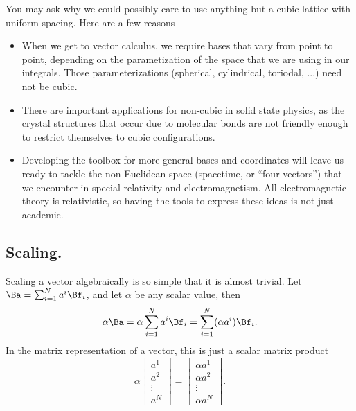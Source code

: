 You may ask why we could possibly care to use anything but a cubic lattice with uniform spacing.
Here are a few reasons
\begin{itemize}
\item When we get to vector calculus, we require bases that vary from point to point, depending on the parametization of the space that we are using in our integrals.
Those parameterizations (spherical, cylindrical, toriodal, ...) need not be cubic.
\item There are important applications for non-cubic in solid state physics, as the crystal structures that occur due to molecular bonds are not friendly enough to restrict themselves to cubic configurations.
\item Developing the toolbox for more general bases and coordinates will leave us ready to tackle the non-Euclidean space (spacetime, or ``four-vectors'') that we encounter in special relativity and electromagnetism.
All electromagnetic theory is relativistic, so having the tools to express these ideas is not just academic.
\end{itemize}
\subsection{Scaling.}
Scaling a vector algebraically is so simple that it is almost trivial.  Let
\( \Ba = \sum_{i = 1}^N a^i \Bf_i \), and let \( \alpha \) be any scalar value, then
\begin{equation}\label{eqn:multivector:240}
\alpha \Ba
=
\alpha \sum_{i = 1}^N a^i \Bf_i
=
\sum_{i = 1}^N (\alpha a^i) \Bf_i.
\end{equation}
In the matrix representation of a vector, this is just a scalar matrix product
\begin{dmath}\label{eqn:multivector:260}
\alpha
\begin{bmatrix}
a^1 \\
a^2 \\
\vdots \\
a^N
\end{bmatrix}
=
\begin{bmatrix}
\alpha a^1 \\
\alpha a^2 \\
\vdots \\
\alpha a^N
\end{bmatrix}.
\end{dmath}
